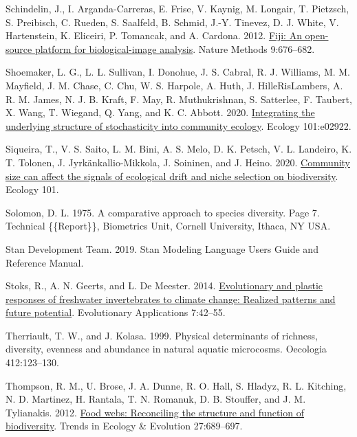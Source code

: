 \documentclass[
]{article}
\newlength{\cslhangindent}
\newlength{\cslentryspacingunit} %
\newenvironment{CSLReferences}[2] %
 {%
  \setlength{\parindent}{0pt}
  \ifodd #1
  \let\oldpar\par
  \def\par{\hangindent=\cslhangindent\oldpar}
  \fi
  \setlength{\parskip}{#2\cslentryspacingunit}
 }%
 {}
\numberwithin{equation}
\begin{document}
\begin{CSLReferences}{1}{0}
\leavevmode{}%
Schindelin, J., I. Arganda-Carreras, E. Frise, V. Kaynig, M. Longair, T.
Pietzsch, S. Preibisch, C. Rueden, S. Saalfeld, B. Schmid, J.-Y.
Tinevez, D. J. White, V. Hartenstein, K. Eliceiri, P. Tomancak, and A.
Cardona. 2012. \href{https://doi.org/10.1038/nmeth.2019}{Fiji: An
open-source platform for biological-image analysis}. Nature Methods
9:676--682.

\leavevmode{}%
Shoemaker, L. G., L. L. Sullivan, I. Donohue, J. S. Cabral, R. J.
Williams, M. M. Mayfield, J. M. Chase, C. Chu, W. S. Harpole, A. Huth,
J. HilleRisLambers, A. R. M. James, N. J. B. Kraft, F. May, R.
Muthukrishnan, S. Satterlee, F. Taubert, X. Wang, T. Wiegand, Q. Yang,
and K. C. Abbott. 2020.
\href{https://doi.org/10.1002/ecy.2922}{Integrating the underlying
structure of stochasticity into community ecology}. Ecology 101:e02922.

\leavevmode{}%
Siqueira, T., V. S. Saito, L. M. Bini, A. S. Melo, D. K. Petsch, V. L.
Landeiro, K. T. Tolonen, J. Jyrkänkallio-Mikkola, J. Soininen, and J.
Heino. 2020. \href{https://doi.org/10.1002/ecy.3014}{Community size can
affect the signals of ecological drift and niche selection on
biodiversity}. Ecology 101.

\leavevmode{}%
Solomon, D. L. 1975. A comparative approach to species diversity. Page
7. Technical \{\{Report\}\}, Biometrics Unit, Cornell University,
Ithaca, NY USA.

\leavevmode{}%
Stan Development Team. 2019. Stan {Modeling Language Users Guide} and
{Reference Manual}.

\leavevmode{}%
Stoks, R., A. N. Geerts, and L. De Meester. 2014.
\href{https://doi.org/10.1111/eva.12108}{Evolutionary and plastic
responses of freshwater invertebrates to climate change: Realized
patterns and future potential}. Evolutionary Applications 7:42--55.

\leavevmode{}%
Therriault, T. W., and J. Kolasa. 1999. Physical determinants of
richness, diversity, evenness and abundance in natural aquatic
microcosms. Oecologia 412:123--130.

\leavevmode{}%
Thompson, R. M., U. Brose, J. A. Dunne, R. O. Hall, S. Hladyz, R. L.
Kitching, N. D. Martinez, H. Rantala, T. N. Romanuk, D. B. Stouffer, and
J. M. Tylianakis. 2012.
\href{https://doi.org/10.1016/j.tree.2012.08.005}{Food webs: Reconciling
the structure and function of biodiversity}. Trends in Ecology \&
Evolution 27:689--697.


\end{CSLReferences}
\end{document}
